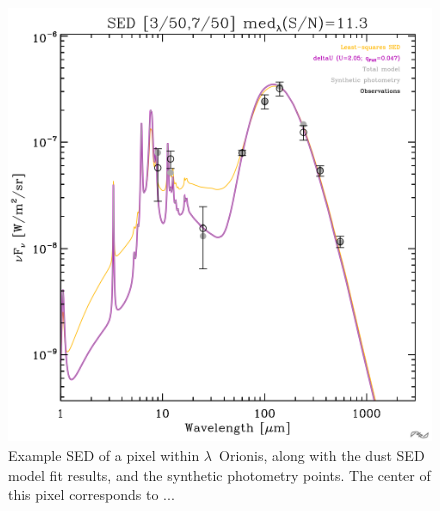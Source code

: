     \begin{figure}

      \includegraphics[width=\textwidth/2]{../Plots/ch_lori/fred_LOri_notes_Oct2017_fig1a.pdf}
      \centering
      \caption{Example SED of a pixel within $\lambda$~Orionis, along with the dust SED model fit results, and the synthetic photometry points. The center of this pixel corresponds to ...}
      \label{fig:fred_LOri_notes_Oct2017_fig1a}
    \end{figure}

